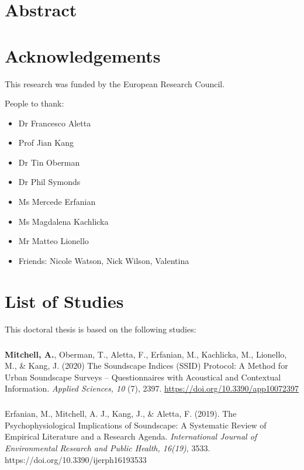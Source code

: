 \documentclass[oneside,fontsize=12pt,titlepage]{scrbook}
\begin{document}
\chapter*{Abstract}


\chapter*{Acknowledgements}
This research was funded by the European Research Council.

People to thank:
\begin{itemize}
      \item Dr Francesco Aletta
      \item Prof Jian Kang
      \item Dr Tin Oberman
      \item Dr Phil Symonds
      \item Ms Mercede Erfanian
      \item Ms Magdalena Kachlicka
      \item Mr Matteo Lionello
      \item Friends: Nicole Watson, Nick Wilson, Valentina
\end{itemize}

\chapter*{List of Studies}

This doctoral thesis is based on the following studies:

\paragraph*{}
\textbf{Mitchell, A.}, Oberman, T., Aletta, F., Erfanian, M., Kachlicka, M., Lionello, M., \& Kang, J. (2020) The Soundscape Indices (SSID) Protocol: A Method for Urban Soundscape Surveys -- Questionnaires with Acoustical and Contextual Information. \emph{Applied Sciences, 10} (7), 2397. \url{https://doi.org/10.3390/app10072397}

\paragraph*{}
Erfanian, M., Mitchell, A. J., Kang, J., \& Aletta, F. (2019). The Psychophysiological Implications of Soundscape: A Systematic Review of Empirical Literature and a Research Agenda. \emph{International Journal of Environmental Research and Public Health, 16(19)}, 3533. https://doi.org/10.3390/ijerph16193533
\end{document}
